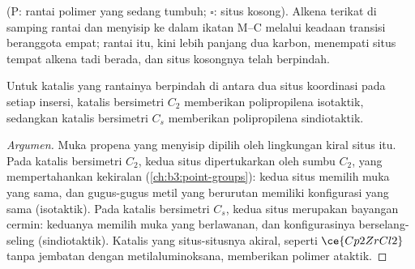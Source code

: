 \begin{omfigure}
\par\medskip

{\small {} (P: rantai polimer yang sedang tumbuh; $\square$: situs
kosong). Alkena terikat di samping rantai dan menyisip ke dalam ikatan M--C
melalui keadaan transisi beranggota empat; rantai itu, kini lebih panjang dua
karbon, menempati situs tempat alkena tadi berada, dan situs kosongnya telah
berpindah.}
\end{omfigure}

\begin{proposition}\label{prop:b3:homogeneous-catalysis:tacticity-symmetry}
Untuk katalis  yang rantainya berpindah di antara dua situs koordinasi
pada setiap insersi, katalis bersimetri $C_2$ memberikan polipropilena
isotaktik, sedangkan katalis bersimetri $C_s$ memberikan polipropilena sindiotaktik.
\end{proposition}

\begin{proof}[Argumen]
Muka propena yang menyisip dipilih oleh lingkungan kiral
situs itu. Pada katalis bersimetri $C_2$, kedua situs dipertukarkan oleh sumbu $C_2$,
yang mempertahankan kekiralan (\cref{ch:b3:point-groups}): kedua situs memilih muka
yang sama, dan gugus-gugus metil yang berurutan memiliki konfigurasi yang sama (isotaktik).
Pada katalis bersimetri $C_s$, kedua situs merupakan bayangan cermin: keduanya memilih muka
yang berlawanan, dan konfigurasinya berselang-seling (sindiotaktik). Katalis yang situs-situsnya
akiral, seperti $\ce{Cp2ZrCl2}$ tanpa jembatan dengan metilaluminoksana, memberikan polimer
ataktik.
\end{proof}

